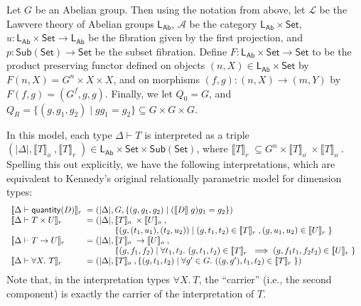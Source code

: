 \documentclass[a4paper,UKenglish]{lipics}
\newcommand{\msf}[1]{\mathsf{#1}} %
\newcommand{\Set}{\msf{Set}}
\newcommand{\Sub}[1]{\msf{Sub}(#1)}
\newcommand{\LAb}{\msf{L}_{\msf{Ab}}}
\newcommand{\A}{\mathcal{A}}
\newcommand{\sem}[1]{\ensuremath{\llbracket #1 \rrbracket} \;}
\newcommand{\semo}[1]{\ensuremath{\llbracket #1 \rrbracket _o} \;}
\newcommand{\semr}[1]{\ensuremath{\llbracket #1 \rrbracket _r} \;}
\newcommand{\qnt}{\msf{quantity}}
\begin{document}
\begin{example}\label{ex:relKen}
Let $G$ be an Abelian group. Then using the notation from above, let $\mathcal{L}$ be the Lawvere theory of Abelian groups $\LAb$, $\A$ be the category $\LAb \times \Set$, $u: \LAb \times \Set \rightarrow \LAb$ be the fibration given by the first projection, and $p:\Sub{\Set}\rightarrow \Set$ be the subset fibration. Define $F:\LAb \times \Set \rightarrow \Set$ to be the product preserving functor defined on objects $(n,X) \in \LAb \times \Set$ by $F(n, X) = G^{n} \times X \times X$, and on morphisms $(f, g) : (n,X) \rightarrow (m, Y)$ by $F(f,g) = (G^f, g, g)$. Finally, we let $Q_0 = G$, and $Q_R = \{(g,g_1,g_2) \mathrel| gg_1 = g_2 \} \subseteq G \times G \times G$.

In this model, each type $\Delta \vdash T$ is interpreted as a triple $(|\Delta|, \semo{T}, \semr{T}) \in \LAb \times \Set \times \Sub{\Set}$, where $\semr{T} \subseteq G^n \times \semo{T} \times \semo{T}$. Spelling this out explicitly, we have the following interpretations, which are equivalent to Kennedy's original relationally parametric model for dimension types:
  \begin{displaymath}
    \begin{array}{l@{\hspace{0.3em}}c@{\hspace{0.3em}}l}
      \semr{\Delta \vdash \qnt(D)} & = & (|\Delta|, G, \{ (g, g_1, g_2) \mathrel| (\sem{D}g)g_1 = g_2 \}) \\
      \semr{\Delta \vdash T \times U} & = &
      (|\Delta|,
      \begin{array}[t]{@{}l}
        \semo{T} \times \semo{U}, \\
        \{ (g, (t_1,u_1), (t_2,u_2)) \mathrel| (g,t_1,t_2) \in \semr{T}, (g,u_1,u_2) \in \semr{U} \}
      \end{array}
      \\
      \semr{\Delta \vdash T \to U} & = &
      (|\Delta|,
      \begin{array}[t]{@{}l}
        \semo{T} \to \semo{U}, \\
        \{ (g, f_1, f_2) \mathrel| \forall t_1, t_2.~(g,t_1,t_2) \in \semr{T} \implies (g,f_1t_1, f_2t_2) \in \semr{U} \}
      \end{array}
      \\
      \semr{\Delta \vdash \forall X.~T} & = & (|\Delta|,
      \begin{array}[t]{@{}l}
        \semo{T},
        \{ (g, t_1, t_2) \mathrel| \forall g' \in G.~((g,g'), t_1, t_2) \in \semr{T} \} )
      \end{array}
    \end{array}
  \end{displaymath}
Note that, in the interpretation types $\forall X.~T$, the ``carrier'' (i.e., the second component) is exactly the carrier of the interpretation of $T$.
\end{example}
\end{document}
